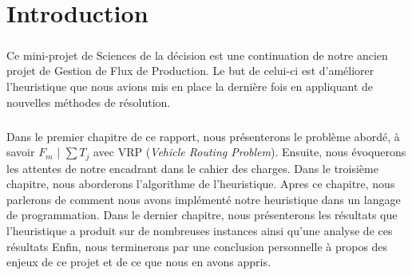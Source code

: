 \chapter{Introduction}

\paragraph{}
Ce mini-projet de Sciences de la décision est une continuation de notre ancien projet de Gestion de Flux de Production. Le but de celui-ci est d'améliorer l'heuristique que nous avions mis en place la dernière fois en appliquant de nouvelles méthodes de résolution.

\paragraph{}
Dans le premier chapitre de ce rapport, nous présenterons le problème abordé, à savoir $ F_m $ | $ \sum{T_{j}} $ avec VRP (\textit{Vehicle Routing Problem}).
Ensuite, nous évoquerons les attentes de notre encadrant dans le cahier des charges.
Dans le troisième chapitre, nous aborderons l'algorithme de l'heuristique.
Apres ce chapitre, nous parlerons de comment nous avons implémenté notre heuristique dans un langage de programmation.
Dans le dernier chapitre, nous présenterons les résultats que l'heuristique a produit sur de nombreuses instances ainsi qu'une analyse de ces résultats
Enfin, nous terminerons par une conclusion personnelle à propos des enjeux de ce projet et de ce que nous en avons appris.
